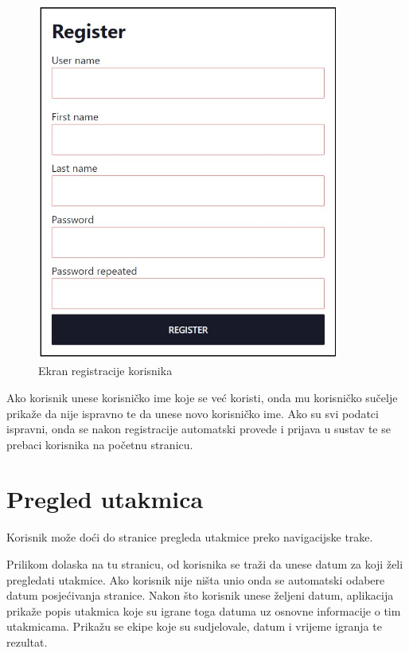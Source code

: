 \documentclass[times, utf8, zavrsni]{fer}
\begin{document}
\begin{figure}[htb]
\centering
\includegraphics[width=10cm]{images/register.jpg}
\caption{Ekran registracije korisnika}
\label{fig:register}
\end{figure}

Ako korisnik unese korisničko ime koje se već koristi, onda mu korisničko sučelje prikaže da nije ispravno te da unese novo korisničko ime.
Ako su svi podatci ispravni, onda se nakon registracije automatski provede i prijava u sustav te se prebaci korisnika na početnu stranicu.

\section{Pregled utakmica}

Korisnik može doći do stranice pregleda utakmice preko navigacijske trake.

Prilikom dolaska na tu stranicu, od korisnika se traži da unese datum za koji želi pregledati utakmice. Ako korisnik nije ništa unio onda se automatski odabere datum posjećivanja stranice.
Nakon što korisnik unese željeni datum, aplikacija prikaže popis utakmica koje su igrane toga datuma uz osnovne informacije o tim utakmicama. Prikažu se ekipe koje su sudjelovale, datum i vrijeme igranja te rezultat.
\end{document}
